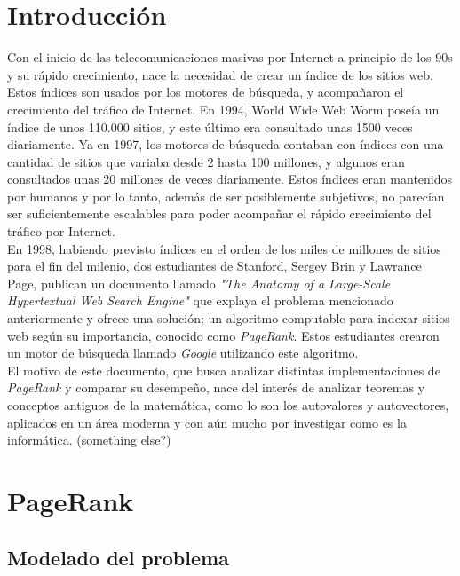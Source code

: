 \documentclass[%
    final,
    reprint,
    notitlepage,
    narroweqnarray,
    inline,
    twoside,
    invited
    ]{ieee}
\begin{document}
\section{Introducción}
Con el inicio de las telecomunicaciones masivas por Internet a principio de los 90s y su rápido crecimiento, nace la necesidad de 
crear un índice de los sitios web. Estos índices son usados por los motores de búsqueda, y acompañaron el crecimiento del tráfico 
de Internet. En 1994, World Wide Web Worm poseía un índice de unos 110.000 sitios, y este último era consultado unas 1500 veces diariamente. Ya en 
1997, los motores de búsqueda contaban con índices con una cantidad de sitios que variaba desde 2 hasta 100 millones, y algunos eran consultados
unas  20 millones de veces diariamente. Estos índices eran mantenidos por humanos y por lo tanto, además de ser posiblemente subjetivos, 
no parecían ser suficientemente escalables para poder acompañar el rápido crecimiento del tráfico por Internet. \\
En 1998, habiendo previsto índices en el orden 
de los miles de millones de sitios para el fin del milenio, dos estudiantes de Stanford, Sergey Brin y Lawrance Page, publican un documento llamado 
\textit{"The Anatomy of a Large-Scale Hypertextual Web Search Engine"} que explaya el problema mencionado anteriormente y ofrece una solución; un 
algoritmo computable para indexar sitios web según su importancia, conocido como \textit{PageRank}. Estos estudiantes crearon un motor de búsqueda 
 llamado \textit{Google} utilizando este algoritmo. \\
El motivo de este documento, que busca analizar distintas implementaciones de \textit{PageRank}  y comparar su desempeño, nace del interés de analizar 
teoremas y conceptos antiguos de la matemática, como lo son los autovalores y autovectores, aplicados en un área moderna y con aún mucho por investigar 
como es la informática. (something else?)


\section{PageRank}

\subsection{Modelado del problema}
\end{document}
